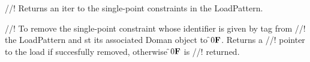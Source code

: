 







//! Returns an iter to the single-point constraints in the LoadPattern.
    
//! To remove the single-point constraint whose identifier is given by \p tag from
//! the LoadPattern and st its associated Doman object to \f$0{\bf F}$. Returns a
//! pointer to the load if succesfully removed, otherwise \f$0{\bf F}$ is
//! returned. 


